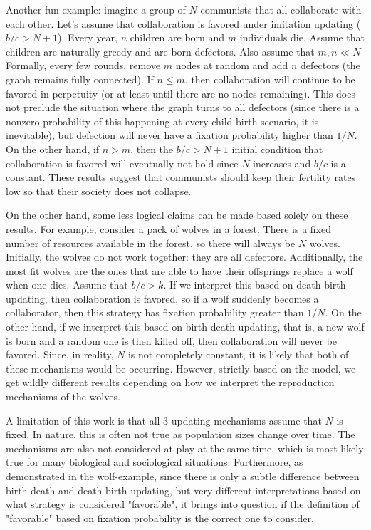 \documentclass[11pt]{article}
\begin{document}
Another fun example: imagine a group of $N$ communists that all collaborate with each other. Let's assume that collaboration is favored under imitation updating ($b/c > N +1$). Every year, $n$ children are born and $m$ individuals die. Assume that children are naturally greedy and are born defectors. Also assume that $m, n \ll N$ Formally, every few rounds, remove $m$ nodes at random and add $n$ defectors (the graph remains fully connected). If $n \leq m$, then collaboration will continue to be favored in perpetuity (or at least until there are no nodes remaining). This does not preclude the situation where the graph turns to all defectors (since there is a nonzero probability of this happening at every child birth scenario, it is inevitable), but defection will never have a fixation probability higher than $1 / N$. On the other hand, if $n > m$, then the $b / c > N + 1$ initial condition that collaboration is favored will eventually not hold since $N$ increases and $b / c$ is a constant. These results suggest that communists should keep their fertility rates low so that their society does not collapse. 

On the other hand, some less logical claims can be made based solely on these results. For example, consider a pack of wolves in a forest. There is a fixed number of resources available in the forest, so there will always be $N$ wolves. Initially, the wolves do not work together: they are all defectors. Additionally, the most fit wolves are the ones that are able to have their offsprings replace a wolf when one dies. Assume that $b / c > k$. If we interpret this based on death-birth updating, then collaboration is favored, so if a wolf suddenly becomes a collaborator, then this strategy has fixation probability greater than $1/N$. On the other hand, if we interpret this based on birth-death updating, that is, a new wolf is born and a random one is then killed off, then collaboration will never be favored. Since, in reality, $N$ is not completely constant, it is likely that both of these mechanisms would be occurring. However, strictly based on the model, we get wildly different results depending on how we interpret the reproduction mechanisms of the wolves. 

A limitation of this work is that all 3 updating mechanisms assume that $N$ is fixed. In nature, this is often not true as population sizes change over time. The mechanisms are also not considered at play at the same time, which is most likely true for many biological and sociological situations. Furthermore, as demonstrated in the wolf-example, since there is only a subtle difference between birth-death and death-birth updating, but very different interpretations based on what strategy is considered "favorable", it brings into question if the definition of "favorable" based on fixation probability is the correct one to consider. 
\end{document}

